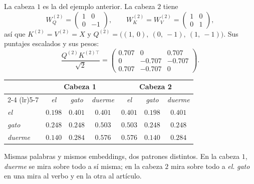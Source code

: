 \documentclass[11pt,letterpaper]{article}
\begin{document}
\begin{ejemplo}
    La cabeza $1$ es la del ejemplo anterior. La cabeza $2$ tiene
    \[
        W_Q^{(2)} = \begin{pmatrix} 1 & 0 \\ 0 & -1 \end{pmatrix} ,
        \qquad
        W_K^{(2)} = W_V^{(2)}
                  = \begin{pmatrix} 1 & 0 \\ 0 & 1 \end{pmatrix} ,
    \]
    así que $K^{(2)} = V^{(2)} = X$ y
    $Q^{(2)} = \big((1,\ 0),\ (0,\ -1),\ (1,\ -1)\big)$. Sus puntajes
    escalados y sus pesos:
    \[
        \frac{Q^{(2)} K^{(2)\top}}{\sqrt{2}}
        = \begin{pmatrix} 0.707 & 0 & 0.707 \\
                          0 & -0.707 & -0.707 \\
                          0.707 & -0.707 & 0 \end{pmatrix} .
    \]
    \begin{center}
    \begin{tabular}{lccc@{\qquad}ccc}
        \toprule
        & \multicolumn{3}{c}{\textbf{Cabeza 1}}
        & \multicolumn{3}{c}{\textbf{Cabeza 2}} \\
        \cmidrule(lr){2-4} \cmidrule(lr){5-7}
        & \textit{el} & \textit{gato} & \textit{duerme}
        & \textit{el} & \textit{gato} & \textit{duerme} \\
        \midrule
        \textit{el}     & $0.198$ & $0.401$ & $0.401$
                        & $0.401$ & $0.198$ & $0.401$ \\
        \textit{gato}   & $0.248$ & $0.248$ & $0.503$
                        & $0.503$ & $0.248$ & $0.248$ \\
        \textit{duerme} & $0.140$ & $0.284$ & $0.576$
                        & $0.576$ & $0.140$ & $0.284$ \\
        \bottomrule
    \end{tabular}
    \end{center}
    Mismas palabras y mismos embeddings, dos patrones distintos. En la
    cabeza $1$, \textit{duerme} se mira sobre todo a sí misma; en la
    cabeza $2$ mira sobre todo a \textit{el}. \textit{gato} en una
    mira al verbo y en la otra al artículo.


\end{ejemplo}
\end{document}
